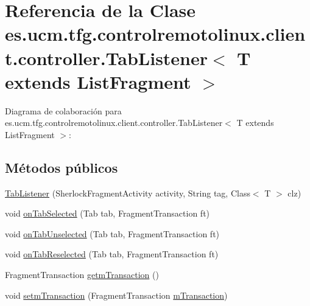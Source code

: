 \hypertarget{classes_1_1ucm_1_1tfg_1_1controlremotolinux_1_1client_1_1controller_1_1TabListener_3_01T_01extends_01ListFragment_01_4}{\section{Referencia de la Clase es.\-ucm.\-tfg.\-controlremotolinux.\-client.\-controller.\-Tab\-Listener$<$ T extends List\-Fragment $>$}
\label{classes_1_1ucm_1_1tfg_1_1controlremotolinux_1_1client_1_1controller_1_1TabListener_3_01T_01extends_01ListFragment_01_4}
}


Diagrama de colaboración para es.\-ucm.\-tfg.\-controlremotolinux.\-client.\-controller.\-Tab\-Listener$<$ T extends List\-Fragment $>$\-:
\subsection*{Métodos públicos}
\begin{DoxyCompactItemize}
\item 
\hyperlink{classes_1_1ucm_1_1tfg_1_1controlremotolinux_1_1client_1_1controller_1_1TabListener_3_01T_01extends_01ListFragment_01_4_a0ac01bc88527485d66fd103e2dc6dbf6}{Tab\-Listener} (Sherlock\-Fragment\-Activity activity, String tag, Class$<$ T $>$ clz)
\item 
void \hyperlink{classes_1_1ucm_1_1tfg_1_1controlremotolinux_1_1client_1_1controller_1_1TabListener_3_01T_01extends_01ListFragment_01_4_aae473d023f89012621cdaf9f0dad53f6}{on\-Tab\-Selected} (Tab tab, Fragment\-Transaction ft)
\item 
void \hyperlink{classes_1_1ucm_1_1tfg_1_1controlremotolinux_1_1client_1_1controller_1_1TabListener_3_01T_01extends_01ListFragment_01_4_abc21f01896a62e23204977c05e286381}{on\-Tab\-Unselected} (Tab tab, Fragment\-Transaction ft)
\item 
void \hyperlink{classes_1_1ucm_1_1tfg_1_1controlremotolinux_1_1client_1_1controller_1_1TabListener_3_01T_01extends_01ListFragment_01_4_a7beeff76f37e9cd01acd75dc77f3ac8f}{on\-Tab\-Reselected} (Tab tab, Fragment\-Transaction ft)
\item 
Fragment\-Transaction \hyperlink{classes_1_1ucm_1_1tfg_1_1controlremotolinux_1_1client_1_1controller_1_1TabListener_3_01T_01extends_01ListFragment_01_4_a607dc4736726f8ca3af8f9147a8a73f2}{getm\-Transaction} ()
\item 
void \hyperlink{classes_1_1ucm_1_1tfg_1_1controlremotolinux_1_1client_1_1controller_1_1TabListener_3_01T_01extends_01ListFragment_01_4_a410c71cfd683c21996090ccbb610d0d4}{setm\-Transaction} (Fragment\-Transaction \hyperlink{classes_1_1ucm_1_1tfg_1_1controlremotolinux_1_1client_1_1controller_1_1TabListener_3_01T_01extends_01ListFragment_01_4_a155f87ca0c2004ce5fcbdc094adc0c05}{m\-Transaction})
\end{DoxyCompactItemize}
